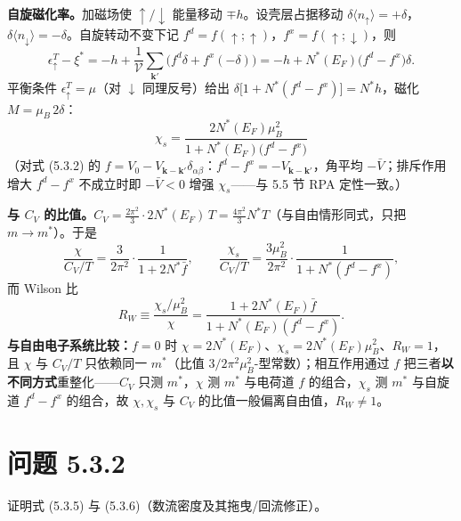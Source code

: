 \textbf{自旋磁化率。}加磁场使 $\uparrow/\downarrow$ 能量移动 $\mp h$。设壳层占据移动 $\delta\langle n_{\uparrow}\rangle=+\delta$，$\delta\langle n_{\downarrow}\rangle=-\delta$。自旋转动不变下记 $f^{d}=f(\uparrow;\uparrow)$，$f^{x}=f(\uparrow;\downarrow)$，则
\begin{equation*}
\epsilon^{T}_{\uparrow}-\xi^{*}=-h+\frac{1}{\mathcal V}\sum_{\pmb{k}'}\big(f^{d}\delta+f^{x}(-\delta)\big)
=-h+N^{*}(E_F)\big(f^{d}-f^{x}\big)\delta .
\end{equation*}
平衡条件 $\epsilon^{T}_{\uparrow}=\mu$（对 $\downarrow$ 同理反号）给出 $\delta\big[1+N^{*}(f^{d}-f^{x})\big]=N^{*}h$，磁化 $M=\mu_B\,\mathrm{2}\delta$：
\begin{equation*}
\boxed{\;\chi_s=\frac{2N^{*}(E_F)\mu_B^{2}}{1+N^{*}(E_F)\big(f^{d}-f^{x}\big)}\;}
\end{equation*}
（对式 (5.3.2) 的 $f=V_0-V_{\pmb{k}-\pmb{k}'}\delta_{\alpha\beta}$：$f^{d}-f^{x}=-V_{\pmb{k}-\pmb{k}'}$，角平均 $-\bar V$；排斥作用增大 $f^{d}-f^{x}$ 不成立时即 $-\bar V<0$ 增强 $\chi_s$——与 5.5 节 RPA 定性一致。）

\textbf{与 $C_V$ 的比值。}$C_V=\frac{2\pi^{2}}{3}\cdot2N^{*}(E_F)\,T=\frac{4\pi^{2}}{3}N^{*}T$（与自由情形同式，只把 $m\to m^{*}$）。于是
\begin{equation*}
\frac{\chi}{C_V/T}=\frac{3}{2\pi^{2}}\cdot\frac{1}{1+2N^{*}\bar f},
\qquad
\frac{\chi_s}{C_V/T}=\frac{3\mu_B^{2}}{2\pi^{2}}\cdot\frac{1}{1+N^{*}(f^{d}-f^{x})},
\end{equation*}
而 Wilson 比
\begin{equation*}
R_W\equiv\frac{\chi_s/\mu_B^{2}}{\chi}
=\frac{1+2N^{*}(E_F)\bar f}{1+N^{*}(E_F)(f^{d}-f^{x})} .
\end{equation*}
\textbf{与自由电子系统比较：}$f=0$ 时 $\chi=2N^{*}(E_F)$、$\chi_s=2N^{*}(E_F)\mu_B^{2}$、$R_W=1$，且 $\chi$ 与 $C_V/T$ 只依赖同一 $m^{*}$（比值 $3/2\pi^{2}\mu_B^{2}$-型常数）；相互作用通过 $f$ 把三者\textbf{以不同方式}重整化——$C_V$ 只测 $m^{*}$，$\chi$ 测 $m^{*}$ 与电荷道 $f$ 的组合，$\chi_s$ 测 $m^{*}$ 与自旋道 $f^{d}-f^{x}$ 的组合，故 $\chi,\chi_s$ 与 $C_V$ 的比值一般偏离自由值，$R_W\neq1$。

\section*{问题 5.3.2}
\begin{problem}
证明式 (5.3.5) 与 (5.3.6)（数流密度及其拖曳/回流修正）。
\end{problem}
\solution

